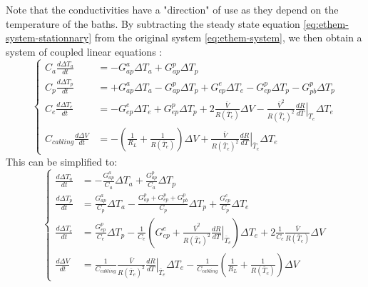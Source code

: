 Note that the conductivities have a "direction" of use as they depend on the temperature of the baths. By subtracting the steady state equation \ref{eq:ethem-system-stationnary} from the original system \ref{eq:ethem-system}, we then obtain a system of coupled linear equations :
\begin{equation}
\label{eq:ethem-system-temp}
\begin{cases}
\displaystyle C_a \frac{d \Delta T_a}{d t}
	&= -G_{ap}^a \Delta T_a + G_{ap}^p \Delta T_p 
	\nonumber \\[10pt]
\displaystyle C_p \frac{d \Delta T_p}{d t} 
	&= +G_{ap}^a \Delta T_a - G_{ap}^p \Delta T_p
	+ G_{ep}^e \Delta T_e - G_{ep}^p \Delta T_p
	- G_{pb}^p \Delta T_p
	\nonumber \\[10pt]
\displaystyle C_e \frac{d \Delta T_e}{d t}
	&= - G_{ep}^e \Delta T_e + G_{ep}^p \Delta T_p
	+2\frac{\bar{V}}{R(\bar{T}_e)} \Delta V - \frac{\bar{V}^2}{R(\bar{T}_e)^2} \left.\frac{d R}{d T}\right\vert_{T_e} \Delta T_e
 	\nonumber \\[10pt]
\displaystyle C_{cabling} \frac{d \Delta V}{d t} &= - \left( \frac{1}{R_L} + \frac{1}{R(\bar{T}_e)} \right) \Delta V + \frac{\bar{V}}{R(\bar{T}_e)^2} \left.\frac{d R}{d T}\right\vert_{\bar{T}_e} \Delta T_e
\end{cases}
\end{equation}
This can be simplified to:
\begin{equation}
\label{eq:ethem-system-temp-simplified}
\begin{cases}
\displaystyle \frac{d \Delta T_a}{d t}
	&= -\frac{G_{ap}^a}{C_a} \Delta T_a + \frac{G_{ap}^p}{C_a} \Delta T_p 
	\nonumber \\[10pt]
\displaystyle \frac{d \Delta T_p}{d t} 
	&= \frac{G_{ap}^a}{C_p} \Delta T_a - \frac{G_{ap}^p+G_{ep}^p+G_{pb}^p}{C_p} \Delta T_p	+ \displaystyle \frac{G_{ep}^e }{C_p}\Delta T_e
	\nonumber \\[10pt]
\displaystyle \frac{d \Delta T_e}{d t}
	&= \frac{G_{ep}^p}{C_e} \Delta T_p - \frac{1}{C_e} \left(G_{ep}^e + \frac{\bar{V}^2}{R(\bar{T}_e)^2} \left.\frac{d R}{d T}\right\vert_{\bar{T}_e}\right) \Delta T_e 
	+2 \frac{1}{C_e} \frac{\bar{V}}{R(\bar{T}_e)} \Delta V
 	\nonumber \\[10pt]
\displaystyle \frac{d \Delta V}{d t} &= \frac{1}{C_{cabling}} \frac{\bar{V}}{R(\bar{T}_e)^2} \left.\frac{d R}{d T}\right\vert_{\bar{T}_e} \Delta T_e - \frac{1}{C_{cabling}}\left( \frac{1}{R_L} + \frac{1}{R(\bar{T}_e)} \right) \Delta V
\end{cases}
\end{equation}

